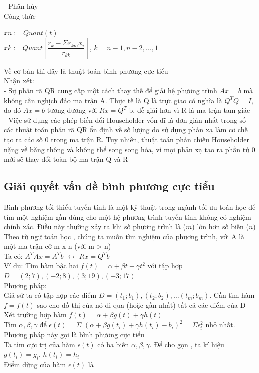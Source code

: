 - Phân hủy \\
Công thức
\begin{center}
	$xn:=Quant(t)$\\
	$xk:=Quant[\dfrac{r_k-\Sigma r_{km}x_i}{r_{kk}}]$, $k=n-1, n-2,..., 1$
\end{center}
Về cơ bản thì đây là thuật toán bình phương cực tiểu
\\
Nhận xét:\\
- Sự phân rã QR cung cấp một cách thay thế để giải hệ phương trình $A x = b$ mà
không cần nghịch đảo ma trận A. Thực tế là Q là trực giao có nghĩa là $Q^{T}Q = I$,
do đó $A x = b$ tương đương với $R x = Q^{T}$
b, dễ giải hơn vì R là ma trận tam giác\\
- Việc sử dụng các phép biến đổi Householder vốn dĩ là đơn giản nhất trong số
các thuật toán phân rã QR ổn định về số lượng do sử dụng phản xạ làm cơ chế
tạo ra các số 0 trong ma trận R. Tuy nhiên, thuật toán phản chiếu Householder
nặng về băng thông và không thể song song hóa, vì mọi phản xạ tạo ra phần tử
0 mới sẽ thay đổi toàn bộ ma trận Q và R\\

\newpage 
\subsection{Giải quyết vấn đề bình phương cực tiểu}
Bình phương tối thiểu tuyến tính là một kỹ thuật trong ngành tối ưu toán học để 
tìm một nghiệm gần đúng cho một hệ phương trình tuyến tính không có nghiệm 
chính xác. Điều này thường xảy ra khi số phương trình là ($m$) lớn hơn 
số biến ($n$)\\
Theo từ ngữ toán học , chúng ta muốn tìm nghiệm của phương trình, với A là một ma trận cỡ m x n (với m > n) \\
Ta có: $A^{T}Ax=A^{T}b$ $\leftrightarrow$ $Rx=Q^{T}b$\\
Ví dụ: Tìm hàm bậc hai $f(t)=\alpha + \beta t + \gamma t^2$ với tập hợp $D={(2;7), (-2;8), (3;19), (-3;17)}$\\
Phương pháp:\\
Giả sử ta có tập hợp các điểm $D={(t_1;b_1),(t_2;b_2),…(t_m;b_m)}$. Cần tìm hàm $f=f(t)$ sao cho đồ thị của nó đi qua (hoặc gần nhất) tất cả các điểm của D\\
Xét trường hợp hàm $f(t)=\alpha +\beta g(t)+\gamma h(t)$\\
Tìm $\alpha, \beta, \gamma$ để $\epsilon(t) =\Sigma$ $(\alpha + \beta g(t_i)+\gamma h(t_i)-b_i)^2=\Sigma \epsilon^2_i$ nhỏ nhất. Phương pháp này gọi là bình phương cực tiểu\\
Ta tìm cực trị của hàm $\epsilon(t)$ có ba biến $\alpha, \beta, \gamma$. Để cho gọn , ta kí hiệu $g(t_i)=g_i$, $h(t_i)=h_i$\\
Điểm dừng của hàm $\epsilon(t)$ là\\

